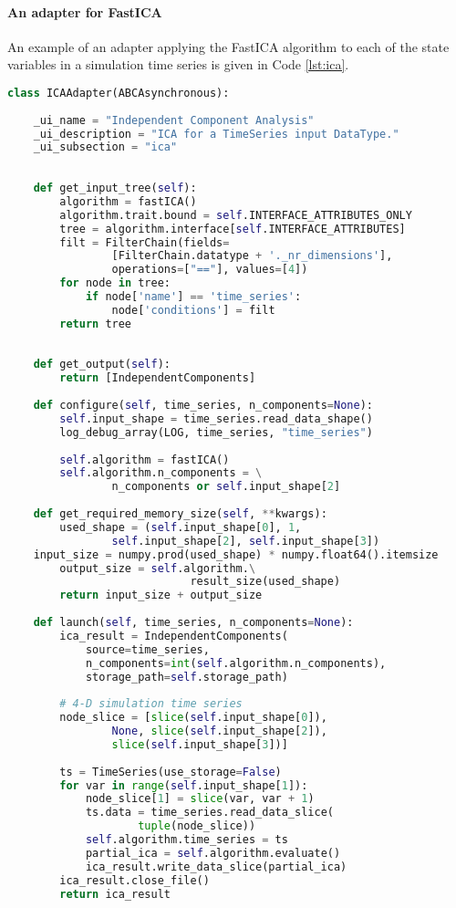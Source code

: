 \documentclass{bioinfo}
\begin{document}
\paragraph{An adapter for FastICA}

An example of an adapter applying the FastICA algorithm to each of the 
state variables in a simulation time series is given in Code \ref{lst:ica}.

\begin{lstlisting}[language=Python]
class ICAAdapter(ABCAsynchronous):
    
    _ui_name = "Independent Component Analysis"
    _ui_description = "ICA for a TimeSeries input DataType."
    _ui_subsection = "ica"
    
    
    def get_input_tree(self):
        algorithm = fastICA()
        algorithm.trait.bound = self.INTERFACE_ATTRIBUTES_ONLY
        tree = algorithm.interface[self.INTERFACE_ATTRIBUTES]
        filt = FilterChain(fields=
                [FilterChain.datatype + '._nr_dimensions'],
                operations=["=="], values=[4])
        for node in tree:
            if node['name'] == 'time_series':
                node['conditions'] = filt
        return tree
    
    
    def get_output(self):
        return [IndependentComponents]
    
    def configure(self, time_series, n_components=None):
        self.input_shape = time_series.read_data_shape()
        log_debug_array(LOG, time_series, "time_series")
        
        self.algorithm = fastICA()
        self.algorithm.n_components = \
                n_components or self.input_shape[2]
        
    def get_required_memory_size(self, **kwargs):
        used_shape = (self.input_shape[0], 1, 
                self.input_shape[2], self.input_shape[3])
	input_size = numpy.prod(used_shape) * numpy.float64().itemsize
        output_size = self.algorithm.\
                            result_size(used_shape)
        return input_size + output_size  
    
    def launch(self, time_series, n_components=None):
        ica_result = IndependentComponents(
            source=time_series,
            n_components=int(self.algorithm.n_components),
            storage_path=self.storage_path)
        
        # 4-D simulation time series
        node_slice = [slice(self.input_shape[0]), 
                None, slice(self.input_shape[2]), 
                slice(self.input_shape[3])]
        
        ts = TimeSeries(use_storage=False)
        for var in range(self.input_shape[1]):
            node_slice[1] = slice(var, var + 1)
            ts.data = time_series.read_data_slice(
                    tuple(node_slice))
            self.algorithm.time_series = ts 
            partial_ica = self.algorithm.evaluate()
            ica_result.write_data_slice(partial_ica)
        ica_result.close_file()
        return ica_result
\end{lstlisting}
\end{document}
